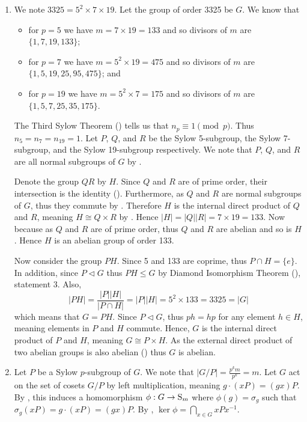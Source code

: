 \begin{enumerate}
    \item We note $3325 = 5^2 \times 7 \times 19$. Let the group of order 3325 be $G$. We know that
    \begin{itemize}
        \item for $p = 5$ we have $m = 7 \times 19 = 133$ and so divisors of $m$ are $\{1, 7, 19, 133\}$;
        \item for $p = 7$ we have $m = 5^2 \times 19 = 475$ and so divisors of $m$ are $\{1, 5, 19, 25, 95, 475\}$; and
        \item for $p = 19$ we have $m = 5^2 \times 7 = 175$ and so divisors of $m$ are $\{1, 5, 7, 25, 35, 175\}$.
    \end{itemize}
    The Third Sylow Theorem () tells us that $n_p \equiv 1 \pmod p$. Thus $n_5 = n_7 = n_{19} = 1$. Let $P$, $Q$, and $R$ be the Sylow 5-subgroup, the Sylow 7-subgroup, and the Sylow 19-subgroup respectively. We note that $P$, $Q$, and $R$ are all normal subgroups of $G$ by .

    Denote the group $QR$ by $H$. Since $Q$ and $R$ are of prime order, their intersection is the identity (). Furthermore, as $Q$ and $R$ are normal subgroups of $G$, thus they commute by . Therefore $H$ is the internal direct product of $Q$ and $R$, meaning $H \cong Q \times R$ by . Hence $|H| = |Q||R| = 7 \times 19 = 133$. Now because as $Q$ and $R$ are of prime order, thus $Q$ and $R$ are abelian and so is $H$. Hence $H$ is an abelian group of order 133.

    Now consider the group $PH$. Since 5 and 133 are coprime, thus $P \cap H = \{e\}$. In addition, since $P \lhd G$ thus $PH \leq G$ by Diamond Isomorphism Theorem (), statement 3. Also,
    \[
        |PH| = \frac{|P||H|}{|P \cap H|} = |P||H| = 5^2 \times 133 = 3325 = |G|
    \]
    which means that $G = PH$. Since $P \lhd G$, thus $ph = hp$ for any element $h \in H$, meaning elements in $P$ and $H$ commute. Hence, $G$ is the internal direct product of $P$ and $H$, meaning $G \cong P \times H$. As the external direct product of two abelian groups is also abelian () thus $G$ is abelian.

    \item Let $P$ be a Sylow $p$-subgroup of $G$. We note that $|G/P| = \frac{p^km}{p^k} = m$. Let $G$ act on the set of cosets $G/P$ by left multiplication, meaning $g\cdot (xP) = (gx)P$. By , this induces a homomorphism $\phi: G \to \mathrm{S}_{m}$ where $\phi(g) = \sigma_g$ such that $\sigma_g(xP) = g\cdot (xP) = (gx)P$. By , $\ker\phi = \bigcap_{x \in G}xPx^{-1}$.
    

\end{enumerate}
